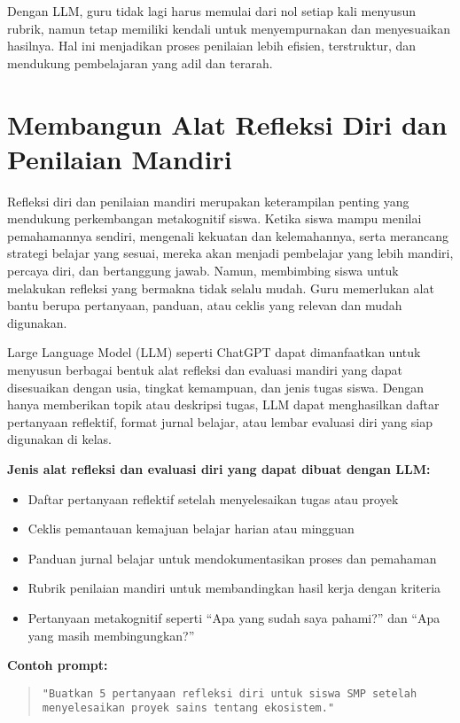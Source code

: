 Dengan LLM, guru tidak lagi harus memulai dari nol setiap kali menyusun rubrik, namun tetap memiliki kendali untuk menyempurnakan dan menyesuaikan hasilnya. Hal ini menjadikan proses penilaian lebih efisien, terstruktur, dan mendukung pembelajaran yang adil dan terarah.

\section{Membangun Alat Refleksi Diri dan Penilaian Mandiri}

Refleksi diri dan penilaian mandiri merupakan keterampilan penting yang mendukung perkembangan metakognitif siswa. Ketika siswa mampu menilai pemahamannya sendiri, mengenali kekuatan dan kelemahannya, serta merancang strategi belajar yang sesuai, mereka akan menjadi pembelajar yang lebih mandiri, percaya diri, dan bertanggung jawab. Namun, membimbing siswa untuk melakukan refleksi yang bermakna tidak selalu mudah. Guru memerlukan alat bantu berupa pertanyaan, panduan, atau ceklis yang relevan dan mudah digunakan.

Large Language Model (LLM) seperti ChatGPT dapat dimanfaatkan untuk menyusun berbagai bentuk alat refleksi dan evaluasi mandiri yang dapat disesuaikan dengan usia, tingkat kemampuan, dan jenis tugas siswa. Dengan hanya memberikan topik atau deskripsi tugas, LLM dapat menghasilkan daftar pertanyaan reflektif, format jurnal belajar, atau lembar evaluasi diri yang siap digunakan di kelas.

\textbf{Jenis alat refleksi dan evaluasi diri yang dapat dibuat dengan LLM:}
\begin{itemize}
	\item Daftar pertanyaan reflektif setelah menyelesaikan tugas atau proyek
	\item Ceklis pemantauan kemajuan belajar harian atau mingguan
	\item Panduan jurnal belajar untuk mendokumentasikan proses dan pemahaman
	\item Rubrik penilaian mandiri untuk membandingkan hasil kerja dengan kriteria
	\item Pertanyaan metakognitif seperti “Apa yang sudah saya pahami?” dan “Apa yang masih membingungkan?”
\end{itemize}

\textbf{Contoh prompt:}

\begin{quote}
	\centering
	\texttt{"Buatkan 5 pertanyaan refleksi diri untuk siswa SMP setelah menyelesaikan proyek sains tentang ekosistem."}
\end{quote}

